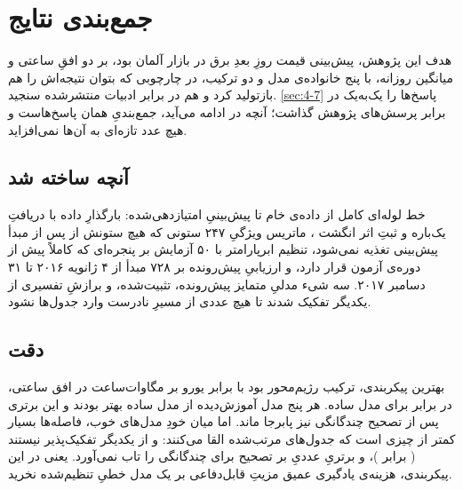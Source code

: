 
\section{جمع‌بندی نتایج}
\label{sec:5-1}

هدف این پژوهش، پیش‌بینی قیمت روزِ بعدِ برق در بازار آلمان بود، بر دو افقِ ساعتی و
میانگین روزانه، با پنج خانواده‌ی مدل و دو ترکیب، در چارچوبی که بتوان نتیجه‌اش را
هم بازتولید کرد و هم در برابر ادبیات منتشرشده سنجید. \cref{sec:4-7} پاسخ‌ها را
یک‌به‌یک در برابر پرسش‌های پژوهش گذاشت؛ آنچه در ادامه می‌آید، جمع‌بندیِ همان
پاسخ‌هاست و هیچ عدد تازه‌ای به آن‌ها نمی‌افزاید.

\subsection*{آنچه ساخته شد}

خط لوله‌ای کامل از داده‌ی خام تا پیش‌بینیِ امتیازدهی‌شده: بارگذارِ داده با
دریافتِ یک‌باره و ثبتِ اثر انگشت ، ماتریس ویژگیِ ۲۴۷ ستونی که هیچ
ستونش از پس از مبدأ پیش‌بینی تغذیه نمی‌شود، تنظیم ابرپارامتر با ۵۰ آزمایش بر
پنجره‌ای که کاملاً پیش از دوره‌ی آزمون قرار دارد، و ارزیابیِ پیش‌رونده بر ۷۲۸
مبدأ از ۴ ژانویه ۲۰۱۶ تا ۳۱ دسامبر ۲۰۱۷. سه شیء مدلیِ متمایز  پیش‌رونده،
تثبیت‌شده، و برازشِ تفسیری  از یکدیگر تفکیک شدند تا هیچ عددی از مسیرِ
نادرست وارد جدول‌ها نشود.

\subsection*{دقت}

بهترین پیکربندی، ترکیب رژیم‌محور بود با  برابر  یورو بر
مگاوات‌ساعت در افق ساعتی، در برابر  برای مدل ساده. هر پنج مدل
آموزش‌دیده از مدل ساده بهتر بودند و این برتری پس از تصحیح چندگانگی نیز پابرجا
ماند. اما میان خودِ مدل‌های خوب، فاصله‌ها بسیار کمتر از چیزی است که جدول‌های
مرتب‌شده القا می‌کنند:  و  از یکدیگر تفکیک‌پذیر نیستند
( برابر )، و برتریِ عددیِ  بر  تصحیح برای
چندگانگی را تاب نمی‌آورد. یعنی در این پیکربندی، هزینه‌ی یادگیری عمیق مزیتِ
قابل‌دفاعی بر یک مدل خطیِ تنظیم‌شده نخرید.

